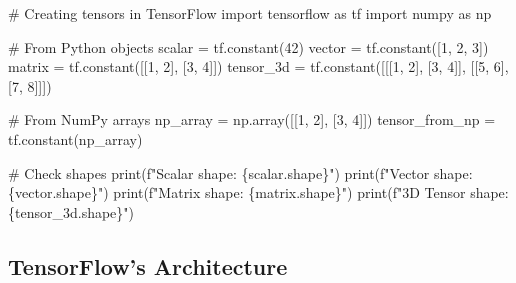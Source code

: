 \documentclass[
  letterpaper,
  DIV=11,
  numbers=noendperiod]{scrreprt}
\newenvironment{Shaded}{\begin{snugshade}}{\end{snugshade}}
\newcommand{\BuiltInTok}[1]{\textcolor[rgb]{0.00,0.23,0.31}{#1}}
\newcommand{\CommentTok}[1]{\textcolor[rgb]{0.37,0.37,0.37}{#1}}
\newcommand{\DecValTok}[1]{\textcolor[rgb]{0.68,0.00,0.00}{#1}}
\newcommand{\ImportTok}[1]{\textcolor[rgb]{0.00,0.46,0.62}{#1}}
\newcommand{\NormalTok}[1]{\textcolor[rgb]{0.00,0.23,0.31}{#1}}
\newcommand{\OperatorTok}[1]{\textcolor[rgb]{0.37,0.37,0.37}{#1}}
\newcommand{\SpecialCharTok}[1]{\textcolor[rgb]{0.37,0.37,0.37}{#1}}
\newcommand{\SpecialStringTok}[1]{\textcolor[rgb]{0.13,0.47,0.30}{#1}}
\begin{document}
\begin{Shaded}
\begin{Highlighting}[]
\CommentTok{\# Creating tensors in TensorFlow}
\ImportTok{import}\NormalTok{ tensorflow }\ImportTok{as}\NormalTok{ tf}
\ImportTok{import}\NormalTok{ numpy }\ImportTok{as}\NormalTok{ np}

\CommentTok{\# From Python objects}
\NormalTok{scalar }\OperatorTok{=}\NormalTok{ tf.constant(}\DecValTok{42}\NormalTok{)}
\NormalTok{vector }\OperatorTok{=}\NormalTok{ tf.constant([}\DecValTok{1}\NormalTok{, }\DecValTok{2}\NormalTok{, }\DecValTok{3}\NormalTok{])}
\NormalTok{matrix }\OperatorTok{=}\NormalTok{ tf.constant([[}\DecValTok{1}\NormalTok{, }\DecValTok{2}\NormalTok{], [}\DecValTok{3}\NormalTok{, }\DecValTok{4}\NormalTok{]])}
\NormalTok{tensor\_3d }\OperatorTok{=}\NormalTok{ tf.constant([[[}\DecValTok{1}\NormalTok{, }\DecValTok{2}\NormalTok{], [}\DecValTok{3}\NormalTok{, }\DecValTok{4}\NormalTok{]], [[}\DecValTok{5}\NormalTok{, }\DecValTok{6}\NormalTok{], [}\DecValTok{7}\NormalTok{, }\DecValTok{8}\NormalTok{]]])}

\CommentTok{\# From NumPy arrays}
\NormalTok{np\_array }\OperatorTok{=}\NormalTok{ np.array([[}\DecValTok{1}\NormalTok{, }\DecValTok{2}\NormalTok{], [}\DecValTok{3}\NormalTok{, }\DecValTok{4}\NormalTok{]])}
\NormalTok{tensor\_from\_np }\OperatorTok{=}\NormalTok{ tf.constant(np\_array)}

\CommentTok{\# Check shapes}
\BuiltInTok{print}\NormalTok{(}\SpecialStringTok{f"Scalar shape: }\SpecialCharTok{\{}\NormalTok{scalar}\SpecialCharTok{.}\NormalTok{shape}\SpecialCharTok{\}}\SpecialStringTok{"}\NormalTok{)}
\BuiltInTok{print}\NormalTok{(}\SpecialStringTok{f"Vector shape: }\SpecialCharTok{\{}\NormalTok{vector}\SpecialCharTok{.}\NormalTok{shape}\SpecialCharTok{\}}\SpecialStringTok{"}\NormalTok{)}
\BuiltInTok{print}\NormalTok{(}\SpecialStringTok{f"Matrix shape: }\SpecialCharTok{\{}\NormalTok{matrix}\SpecialCharTok{.}\NormalTok{shape}\SpecialCharTok{\}}\SpecialStringTok{"}\NormalTok{)}
\BuiltInTok{print}\NormalTok{(}\SpecialStringTok{f"3D Tensor shape: }\SpecialCharTok{\{}\NormalTok{tensor\_3d}\SpecialCharTok{.}\NormalTok{shape}\SpecialCharTok{\}}\SpecialStringTok{"}\NormalTok{)}
\end{Highlighting}
\end{Shaded}

\subsection{TensorFlow's Architecture}\label{tensorflows-architecture}
\end{document}
